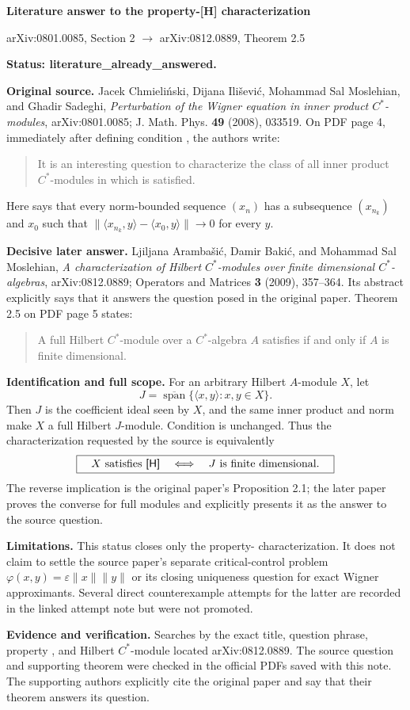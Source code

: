 \documentclass[10pt]{article}
\begin{document}
\begin{center}
{\Large\bfseries Literature answer to the property-[H] characterization}\par
\medskip
{\small arXiv:0801.0085, Section 2 $\longrightarrow$ arXiv:0812.0889, Theorem 2.5}
\end{center}

\textbf{Status: literature\_already\_answered.}

\textbf{Original source.} Jacek Chmieli\'nski, Dijana Ili\v sevi\'c,
Mohammad Sal Moslehian, and Ghadir Sadeghi,
\emph{Perturbation of the Wigner equation in inner product $C^*$-modules},
arXiv:0801.0085; J. Math. Phys. \textbf{49} (2008), 033519.
On PDF page 4, immediately after defining condition {\sf [H]}, the authors write:
\begin{quote}
It is an interesting question to characterize the class of all inner product
$C^*$-modules in which {\sf [H]} is satisfied.
\end{quote}
Here {\sf [H]} says that every norm-bounded sequence $(x_n)$ has a subsequence
$(x_{n_k})$ and $x_0$ such that
$\|\langle x_{n_k},y\rangle-\langle x_0,y\rangle\|\to0$ for every $y$.

\textbf{Decisive later answer.} Ljiljana Aramba\v si\'c, Damir Baki\'c, and
Mohammad Sal Moslehian,
\emph{A characterization of Hilbert $C^*$-modules over finite dimensional
$C^*$-algebras}, arXiv:0812.0889; Operators and Matrices \textbf{3} (2009),
357--364.  Its abstract explicitly says that it answers the question posed in
the original paper.  Theorem 2.5 on PDF page 5 states:
\begin{quote}
A full Hilbert $C^*$-module over a $C^*$-algebra $A$ satisfies {\sf [H]} if
and only if $A$ is finite dimensional.
\end{quote}

\textbf{Identification and full scope.} For an arbitrary Hilbert $A$-module
$X$, let
\[
J=\overline{\operatorname{span}}\{\langle x,y\rangle:x,y\in X\}.
\]
Then $J$ is the coefficient ideal seen by $X$, and the same inner product and
norm make $X$ a full Hilbert $J$-module.  Condition {\sf [H]} is unchanged.
Thus the characterization requested by the source is equivalently
\[
\boxed{\quad X\text{ satisfies {\sf [H]}}\quad\Longleftrightarrow\quad
J\text{ is finite dimensional}.\quad}
\]
The reverse implication is the original paper's Proposition 2.1; the later
paper proves the converse for full modules and explicitly presents it as the
answer to the source question.

\textbf{Limitations.} This status closes only the property-{\sf [H]}
characterization.  It does not claim to settle the source paper's separate
critical-control problem $\varphi(x,y)=\varepsilon\|x\|\|y\|$ or its closing
uniqueness question for exact Wigner approximants.  Several direct
counterexample attempts for the latter are recorded in the linked attempt
note but were not promoted.

\textbf{Evidence and verification.} Searches by the exact title, question
phrase, property {\sf [H]}, and Hilbert $C^*$-module located arXiv:0812.0889.
The source question and supporting theorem were checked in the official PDFs
saved with this note.  The supporting authors explicitly cite the original
paper and say that their theorem answers its question.
\end{document}
